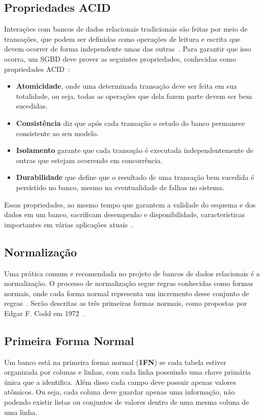 \subsection{Propriedades ACID}
Interações com bancos de dados relacionais tradicionais são feitas por meio de transações, que podem ser definidas como operações de leitura e escrita que devem ocorrer de forma independente umas das outras~\cite{dmsbook}. Para garantir que isso ocorra, um SGBD deve prover as seguintes propriedades, conhecidas como propriedades ACID~\cite{haerder}:
\begin{itemize}
	\item \textbf{Atomicidade}, onde uma determinada transação deve ser feita em sua totalidade, ou seja, todas as operações que dela fazem parte devem ser bem sucedidas.
	\item \textbf{Consistência} diz que após cada transação o estado do banco permanece consistente ao seu modelo.
	\item \textbf{Isolamento} garante que cada transação é executada independentemente de outras que estejam ocorrendo em concorrência.
	\item \textbf{Durabilidade} que define que o resultado de uma transação bem sucedida é persistido no banco, mesmo na eventualidade de falhas no sistema.
\end{itemize}

Essas propriedades, ao mesmo tempo que garantem a validade do esquema e dos dados em um banco, sacrificam desempenho e disponibilidade, características importantes em várias aplicações atuais~\cite{foxcluster}.

\subsection{Normalização}
Uma prática comum e recomendada no projeto de bancos de dados relacionais é a normalização. O processo de normalização segue regras conhecidas como formas normais, onde cada forma normal representa um incremento desse conjunto de regras~\cite{jan}. Serão descritas as três primeiras formas normais, como propostas por Edgar F. Codd em 1972~\cite{cjdate}.

\subsection*{Primeira Forma Normal}
Um banco está na primeira forma normal (\textbf{1FN}) se cada tabela estiver organizada por colunas e linhas, com cada linha possuindo uma chave primária única que a identifica. 
Além disso cada campo deve possuir apenas valores atômicos. Ou seja, cada coluna deve guardar apenas uma informação, não podendo existir listas ou conjuntos de valores dentro de uma mesma coluna de uma linha.

